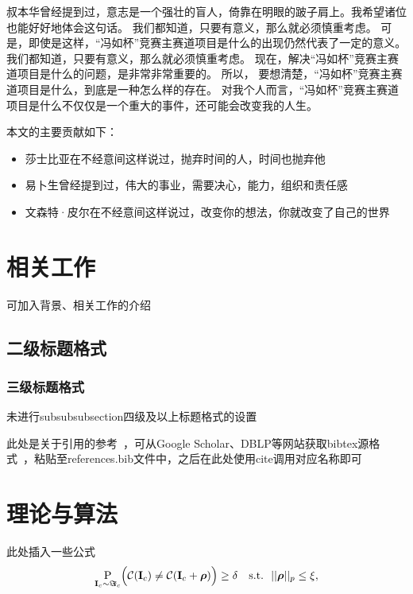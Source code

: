 \documentclass[zihao=-4]{ctexart}
\begin{document}
\begin{spacing}{1.5}
叔本华曾经提到过，意志是一个强壮的盲人，倚靠在明眼的跛子肩上。我希望诸位也能好好地体会这句话。 我们都知道，只要有意义，那么就必须慎重考虑。 可是，即使是这样，“冯如杯”竞赛主赛道项目是什么的出现仍然代表了一定的意义。 我们都知道，只要有意义，那么就必须慎重考虑。 现在，解决“冯如杯”竞赛主赛道项目是什么的问题，是非常非常重要的。 所以， 要想清楚，“冯如杯”竞赛主赛道项目是什么，到底是一种怎么样的存在。 对我个人而言，“冯如杯”竞赛主赛道项目是什么不仅仅是一个重大的事件，还可能会改变我的人生。\par


本文的主要贡献如下：\par
\begin{itemize}
	\item 莎士比亚在不经意间这样说过，抛弃时间的人，时间也抛弃他
	\item 易卜生曾经提到过，伟大的事业，需要决心，能力，组织和责任感
	\item 文森特·皮尔在不经意间这样说过，改变你的想法，你就改变了自己的世界
\end{itemize}
	
\section{相关工作}
可加入背景、相关工作的介绍

\subsection{二级标题格式}
\subsubsection{三级标题格式}
未进行subsubsubsection四级及以上标题格式的设置\par

此处是关于引用的参考~\cite{Squeez}，可从Google Scholar、DBLP等网站获取bibtex源格式~\cite{Goodfellow_2015}，粘贴至references.bib文件\cite{Xu_2017Squueze}中，之后在此处使用cite调用对应名称即可~\cite{Carlini_2016}\par

\section{理论与算法}

此处插入一些公式
\begin{align}
\underset{{\bf I}_c \sim \boldsymbol\Im_c}{\mathrm{\text P}} \Big( \mathcal C({\bf I}_c) \neq \mathcal C({\bf I}_c + \boldsymbol \rho) \Big) \geq \delta ~~~\text{s.t.}~~||\boldsymbol\rho||_p \leq \xi,
\label{eq:def1}
\end{align}


\end{spacing}
\end{document}
